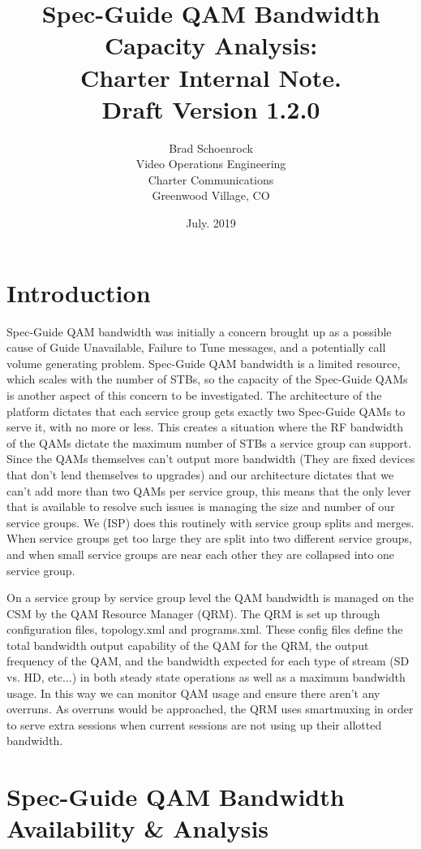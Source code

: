 \documentclass{article}
\author{Brad Schoenrock\\Video Operations Engineering\\Charter Communications\\Greenwood Village, CO}
\title{Spec-Guide QAM Bandwidth Capacity Analysis:\\Charter Internal Note.\\Draft Version 1.2.0}
\date{July. 2019}
\begin{document}
\maketitle
\newpage

\tableofcontents
\newpage

\section{Introduction}
\label{SECTION-Introduction}

Spec-Guide QAM bandwidth was initially a concern brought up as a possible cause of Guide Unavailable, Failure to Tune messages, and a potentially call volume generating problem. Spec-Guide QAM bandwidth is a limited resource, which scales with the number of STBs, so the capacity of the Spec-Guide QAMs is another aspect of this concern to be investigated. The architecture of the platform dictates that each service group gets exactly two Spec-Guide QAMs to serve it, with no more or less. This creates a situation where the RF bandwidth of the QAMs dictate the maximum number of STBs a service group can support. Since the QAMs themselves can't output more bandwidth (They are fixed devices that don't lend themselves to upgrades) and our architecture dictates that we can't add more than two QAMs per service group, this means that the only lever that is available to resolve such issues is managing the size and number of our service groups. We (ISP) does this routinely with service group splits and merges. When service groups get too large they are split into two different service groups, and when small service groups are near each other they are collapsed into one service group. 

On a service group by service group level the QAM bandwidth is managed on the CSM by the QAM Resource Manager (QRM). The QRM is set up through configuration files, topology.xml and programs.xml. These config files define the total bandwidth output capability of the QAM for the QRM, the output frequency of the QAM, and the bandwidth expected for each type of stream (SD vs. HD, etc...) in both steady state operations as well as a maximum bandwidth usage. In this way we can monitor QAM usage and ensure there aren't any overruns. As overruns would be approached, the QRM uses smartmuxing in order to serve extra sessions when current sessions are not using up their allotted bandwidth. 



\section{Spec-Guide QAM Bandwidth Availability \& Analysis}
\label{SECTION-QAMCapacity}
\end{document}
